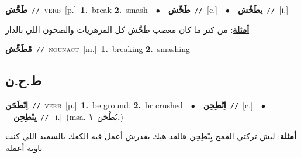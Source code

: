 \documentclass[10pt,a4paper,twoside]{article} %
\begin{document}
\begin{multicols}{2}
{\setlength\topsep{0pt}\textbf{\foreignlanguage{arabic}{طَحَّش}}\ {\color{gray}\texttt{//}\color{black}}\ \textsc{verb}\ [p.]\ \textbf{1.}~break  \textbf{2.}~smash\ \ $\bullet$\ \ \setlength\topsep{0pt}\textbf{\foreignlanguage{arabic}{طَحِّش}}\ {\color{gray}\texttt{//}\color{black}}\ [c.]\ \ $\bullet$\ \ \setlength\topsep{0pt}\textbf{\foreignlanguage{arabic}{يطَحِّش}}\ {\color{gray}\texttt{//}\color{black}}\ [i.]\  \begin{flushright}\color{gray}\foreignlanguage{arabic}{\textbf{\underline{\foreignlanguage{arabic}{أمثلة}}}: من كثر ما كان معصب طَحَّش كل المزهريات والصحون اللي بالدار}\end{flushright}\color{black}} \vspace{2mm}

{\setlength\topsep{0pt}\textbf{\foreignlanguage{arabic}{مْطَحِّش}}\ {\color{gray}\texttt{//}\color{black}}\ \textsc{noun\textunderscore act}\ [m.]\ \textbf{1.}~breaking  \textbf{2.}~smashing\ } \vspace{2mm}

\vspace{-3mm}
\subsection*{\color{blue}\foreignlanguage{arabic}{ط.ح.ن}\color{blue}{}} 

{\setlength\topsep{0pt}\textbf{\foreignlanguage{arabic}{اِنْطَحَن}}\ {\color{gray}\texttt{//}\color{black}}\ \textsc{verb}\ [p.]\ \textbf{1.}~be ground.  \textbf{2.}~br crushed\ \ $\bullet$\ \ \setlength\topsep{0pt}\textbf{\foreignlanguage{arabic}{اِنْطِحِن}}\ {\color{gray}\texttt{//}\color{black}}\ [c.]\ \ $\bullet$\ \ \setlength\topsep{0pt}\textbf{\foreignlanguage{arabic}{يِنْطِحِن}}\ {\color{gray}\texttt{//}\color{black}}\ [i.]\ \color{gray}(msa. \foreignlanguage{arabic}{يُطْحَن}~\foreignlanguage{arabic}{\textbf{١.}})\color{black}\  \begin{flushright}\color{gray}\foreignlanguage{arabic}{\textbf{\underline{\foreignlanguage{arabic}{أمثلة}}}: ليش تركتي القمح يِنْطِحِن هالقد هيك بقدرش أعمل فيه الكعك بالسميد اللي كنت ناوية أعمله}\end{flushright}\color{black}} \vspace{2mm}


\end{multicols}
\end{document}
